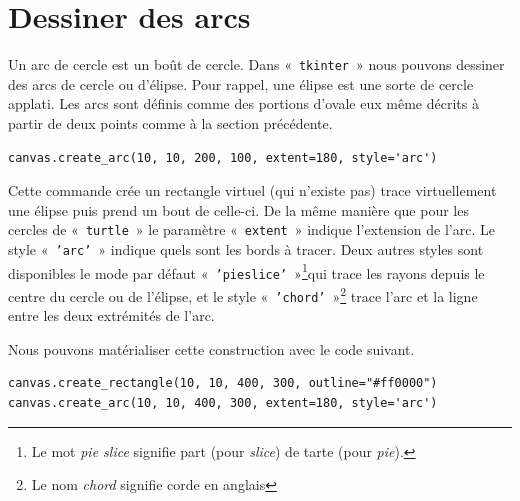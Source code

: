 \section{Dessiner des arcs}
Un arc de cercle est un boût de cercle. Dans «~\texttt{tkinter}~» nous pouvons dessiner des arcs de cercle ou d'élipse. Pour rappel, une élipse est une sorte de cercle applati. 
Les arcs sont définis comme des portions d'ovale eux même décrits à partir de deux points comme à la section précédente.

\begin{Verbatim}[frame=single,rulecolor=\color{mbleu}, label=à taper]
canvas.create_arc(10, 10, 200, 100, extent=180, style='arc')
\end{Verbatim}



Cette commande crée un rectangle virtuel (qui n'existe pas) trace virtuellement une élipse puis prend un bout de celle-ci.
De la même manière que pour les cercles de «~\texttt{turtle}~» le paramètre «~\texttt{extent}~» indique l'extension de l'arc. Le style «~\texttt{'arc'}~» indique quels sont les bords à tracer. Deux autres styles sont disponibles le mode par défaut «~\texttt{'pieslice'}~»\footnote{Le mot \emph{pie slice} signifie part (pour \emph{slice}) de tarte (pour \emph{pie}).}qui trace les rayons depuis le centre du cercle ou de l'élipse, et le style «~\texttt{'chord'}~»\footnote{Le nom \emph{chord} signifie corde en anglais} trace l'arc et la ligne entre les deux extrémités de l'arc.

Nous pouvons matérialiser cette construction avec le code suivant.

\begin{Verbatim}[frame=single,rulecolor=\color{mbleu}, label=à taper]
canvas.create_rectangle(10, 10, 400, 300, outline="#ff0000")
canvas.create_arc(10, 10, 400, 300, extent=180, style='arc')
\end{Verbatim}


